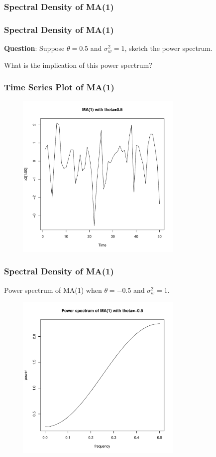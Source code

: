 \documentclass[%
xcolor=pdftex]{beamer}
\begin{document}
\begin{frame}
\frametitle{Spectral Density of MA(1)}



\end{frame}

\begin{frame}
\frametitle{Spectral Density of MA(1)}

\textbf{Question}: Suppose $\theta=0.5$ and $\sigma_w^2=1$, sketch the power spectrum.

\vspace{40mm}

What is the implication of this power spectrum?

\end{frame}

\begin{frame}
\frametitle{Time Series Plot of MA(1)}


\includegraphics[width=100mm, height=80mm]{ma1_1ts.pdf}


\end{frame}

\begin{frame}
\frametitle{Spectral Density of MA(1)}

Power spectrum of MA(1) when $\theta=-0.5$ and $\sigma_w^2=1$.

\includegraphics[width=100mm, height=80mm]{ma1_2power.pdf}

\end{frame}
\end{document}
